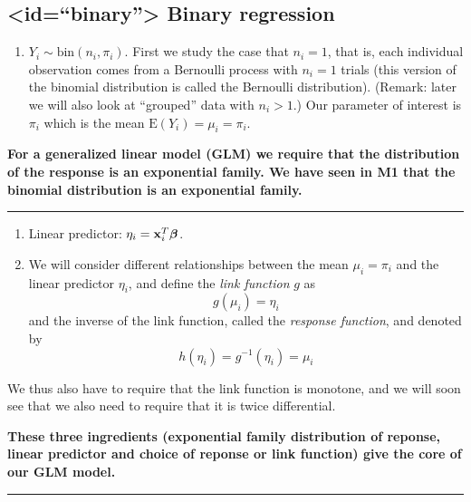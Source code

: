 \documentclass[
]{article}
\providecommand{\tightlist}{%
  \setlength{\itemsep}{0pt}\setlength{\parskip}{0pt}}
\begin{document}
\hypertarget{idbinary-binary-regression}{%
\subsection{\textless id=``binary''\textgreater{} Binary
regression}\label{idbinary-binary-regression}}

\begin{enumerate}
\def\labelenumi{\arabic{enumi}.}
\tightlist
\item
  \(Y_i \sim \text{bin}(n_i,\pi_i)\). First we study the case that
  \(n_i=1\), that is, each individual observation comes from a Bernoulli
  process with \(n_i=1\) trials (this version of the binomial
  distribution is called the Bernoulli distribution). (Remark: later we
  will also look at ``grouped'' data with \(n_i>1\).) Our parameter of
  interest is \(\pi_i\) which is the mean \(\text{E}(Y_i)=\mu_i=\pi_i\).
\end{enumerate}

\textbf{For a generalized linear model (GLM) we require that the
distribution of the response is an exponential family. We have seen in
M1 that the binomial distribution is an exponential family.}

\begin{center}\rule{0.5\linewidth}{0.5pt}\end{center}

\begin{enumerate}
\def\labelenumi{\arabic{enumi}.}
\setcounter{enumi}{1}
\item
  Linear predictor: \(\eta_i={\bf x}_i^T \boldsymbol{\beta}\).
\item
  We will consider different relationships between the mean
  \(\mu_i=\pi_i\) and the linear predictor \(\eta_i\), and define the
  \emph{link function} \(g\) as \[g(\mu_i)=\eta_i\] and the inverse of
  the link function, called the \emph{response function}, and denoted by
  \[h(\eta_i)=g^{-1}(\eta_i)=\mu_i\]
\end{enumerate}

We thus also have to require that the link function is monotone, and we
will soon see that we also need to require that it is twice
differential.

\textbf{These three ingredients (exponential family distribution of
reponse, linear predictor and choice of reponse or link function) give
the core of our GLM model.}

\begin{center}\rule{0.5\linewidth}{0.5pt}\end{center}
\end{document}
